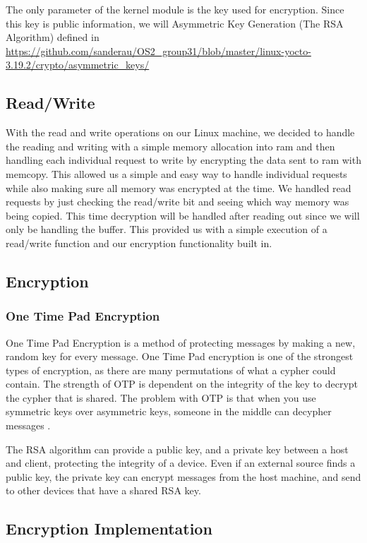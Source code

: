 \documentclass[onecolumn, draftclsnofoot,10pt, compsoc]{IEEEtran}
\begin{document}
    The only parameter of the kernel module is the key used for encryption. 
    Since this key is public information, we will Asymmetric Key Generation (The RSA Algorithm) defined in \url{https://github.com/sanderau/OS2_group31/blob/master/linux-yocto-3.19.2/crypto/asymmetric_keys/ }
        
    \subsection{Read/Write}
    With the read and write operations on our Linux machine, we decided to handle the reading and writing with a simple memory allocation into ram and then handling each individual request to write by encrypting the data sent to ram with memcopy. This allowed us a simple and easy way to handle individual requests while also making sure all memory was encrypted at the time. We handled read requests by just checking the read/write bit and seeing which way memory was being copied. This time decryption will be handled after reading out since we will only be handling the buffer. This provided us with a simple execution of a read/write function and our encryption functionality built in.

    \subsection{Encryption}
    \subsubsection{ One Time Pad Encryption }
        One Time Pad Encryption \cite{khanAcademy} is a method of protecting messages by making a new, random key for every message.
        One Time Pad encryption is one of the strongest types of encryption, as there are many permutations of what a cypher could contain. 
        The strength of OTP is dependent on the integrity of the key to decrypt the cypher that is shared. 
        The problem with OTP is that when you use symmetric keys over asymmetric keys, someone in the middle can decypher messages \cite{asymmetric}.

        The RSA algorithm can provide a public key, and a private key between a host and client, protecting the integrity of a device.
        Even if an external source finds a public key, the private key can encrypt messages from the host machine, and send to other devices that have a shared RSA key.
        
        \subsection{Encryption Implementation}
        
\end{document}
